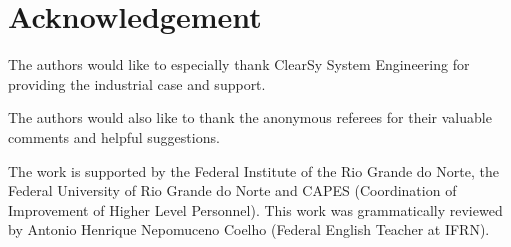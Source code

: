\documentclass[runningheads]{llncs}
\begin{document}
\section*{Acknowledgement}
  The authors would like to especially thank ClearSy System Engineering for providing the industrial case and support. 

  The authors would also like to thank the anonymous referees for their valuable comments and helpful suggestions. 
  
  The work is supported by the Federal Institute of the Rio Grande do Norte, the Federal University of Rio Grande do Norte and CAPES (Coordination of Improvement of Higher Level Personnel).
  This work was grammatically reviewed by Antonio Henrique Nepomuceno Coelho (Federal English Teacher at IFRN).



%
%
%




 
\end{document}
